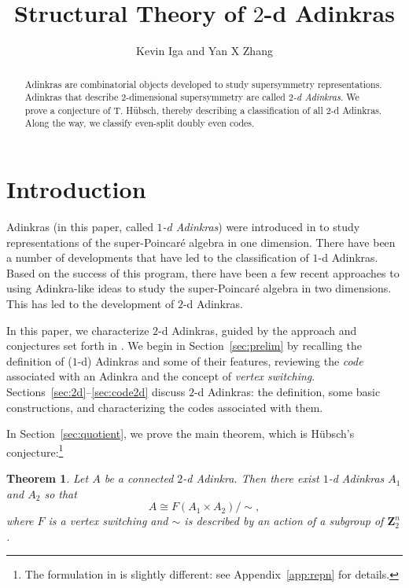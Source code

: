 \documentclass[12pt,twoside,singlespace]{article}
\title{Structural Theory of $2$-d Adinkras}
\author{Kevin Iga and Yan X Zhang}
\numberwithin{equation}{section}
\newtheorem{thm}[equation]{Theorem}
\theoremstyle{definition}
\newcommand{\ZZ}{\mathbf{Z}}
\begin{document}
\pagestyle{plain}

\maketitle

\begin{abstract}
Adinkras are combinatorial objects developed to study supersymmetry representations.  Adinkras that describe $2$-dimensional supersymmetry are called \emph{$2$-d Adinkras}.  We prove a conjecture of T. H\"ubsch, thereby describing a classification of all $2$-d Adinkras.  Along the way, we classify even-split doubly even codes.
\end{abstract}


\section{Introduction}
Adinkras (in this paper, called \emph{$1$-d Adinkras}) were introduced in \cite{d2l:first} to study representations of the super-Poincar\'e algebra in one dimension.  There have been a number of developments that have led to the classification of $1$-d Adinkras.\cite{d2l:decodes,d2l:topology, d2l:graph-theoretic,dil:cohomology,d2l:omni,zhang:adinkras}  Based on the success of this program, there have been a few recent approaches to using Adinkra-like ideas to study the super-Poincar\'e algebra in two dimensions.  This has led to the development of $2$-d Adinkras.\cite{gates:dimensional_extension,hubsch:weaving}

In this paper, we characterize $2$-d Adinkras, guided by the approach and conjectures set forth in \cite{hubsch:weaving}. We begin in Section~\ref{sec:prelim} by recalling the definition of ($1$-d) Adinkras and some of their features, reviewing the \emph{code} associated with an Adinkra\cite{d2l:omni} and the concept of \emph{vertex switching}.\cite{dil:cohomology,zhang:adinkras}  Sections~\ref{sec:2d}--\ref{sec:code2d} discuss $2$-d Adinkras: the definition, some basic constructions, and characterizing the codes associated with them.

In Section~\ref{sec:quotient}, we prove the main theorem, which is H\"ubsch's conjecture:\footnote{The formulation in \cite{hubsch:weaving} is slightly different: see Appendix~\ref{app:repn} for details.}

\begin{thm}
\label{thm:main}
Let $A$ be a connected $2$-d Adinkra.  Then there exist $1$-d Adinkras $A_1$ and $A_2$ so that
\[A\cong F(A_1\times A_2)/\sim, \]
where $F$ is a vertex switching and  $\sim$ is described by an action of a subgroup of $\ZZ_2^n$.
\end{thm}
\end{document}
